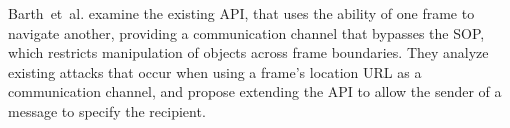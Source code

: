 Barth~et~al.\cite{barth.etal+08} examine the existing  API, that uses the ability of one frame to navigate another, providing a communication channel that bypasses the SOP, which restricts manipulation of objects across frame boundaries.
They analyze existing attacks that occur when using a frame's location URL as a communication channel, and propose extending the API to allow the sender of a message to specify the recipient.
